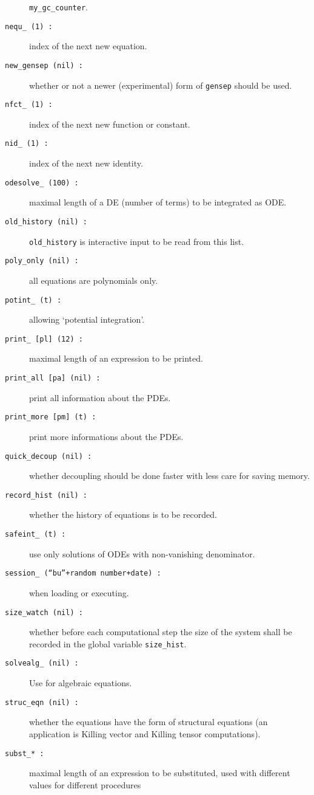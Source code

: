 \begin{description}
  \texttt{my\_gc\_counter}.
\item[\texttt{nequ\_ (1) :}] index of the next new equation.
\item[\texttt{new\_gensep (nil) :}] whether or not a newer
  (experimental) form of \texttt{gensep} should be used.
\item[\texttt{nfct\_ (1) :}] index of the next new function or
  constant.
\item[\texttt{nid\_ (1) :}] index of the next new identity.
\item[\texttt{odesolve\_ (100) :}] maximal length of a DE (number of
  terms) to be integrated as ODE.
\item[\texttt{old\_history (nil) :}] \texttt{old\_history} is
  interactive input to be read from this list.
\item[\texttt{poly\_only (nil) :}] all equations are polynomials only.
\item[\texttt{potint\_ (t) :}] allowing `potential integration'.
\item[\texttt{print\_ [pl] (12) :}] maximal length of an expression to
  be printed.
\item[\texttt{print\_all [pa] (nil) :}] print all information about
  the PDEs.
\item[\texttt{print\_more [pm] (t) :}] print more informations about
  the PDEs.
\item[\texttt{quick\_decoup (nil) :}] whether decoupling should be
  done faster with less care for saving memory.
\item[\texttt{record\_hist (nil) :}] whether the history of equations
  is to be recorded.
\item[\texttt{safeint\_ (t) :}] use only solutions of ODEs with
  non-vanishing denominator.
\item[\texttt{session\_ (``bu''+random number+date) :}] when loading
   or executing.
\item[\texttt{size\_watch (nil) :}] whether before each computational
  step the size of the system shall be recorded in the global variable
  \texttt{size\_hist}.
\item[\texttt{solvealg\_ (nil) :}] Use  for algebraic
  equations.
\item[\texttt{struc\_eqn (nil) :}] whether the equations have the form
  of structural equations (an application is Killing vector and
  Killing tensor computations).
\item[\texttt{subst\_* :}] maximal length of an expression to be
  substituted, used with different values for different procedures

\end{description}

